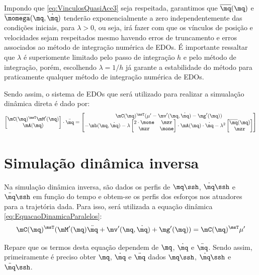 \documentclass[]{politex}
\begin{document}
Impondo que \eqref{eq:VinculosQuasiAce3} seja respeitada, garantimos que $\overline{\mq}(\mq)$ e $\overline{\momega}(\mq, \dot{\mq})$ tenderão exponencialmente a zero independentemente das condições iniciais, para $\lambda > 0$, ou seja, irá fazer com que os vínculos de posição e velocidades sejam respeitados mesmo havendo erros de truncamento e erros associados ao método de integração numérica de EDOs. É importante ressaltar que $\lambda$ é superiomente limitado pelo passo de integração $h$ e pelo método de integração, porém, escolhendo $\lambda = 1/h$ já garante a estabilidade do método para praticamente qualquer método de integração numérica de EDOs.

Sendo assim, o sistema de EDOs que será utilizado para realizar a simualação dinâmica direta é dado por:
\begin{equation}
\begin{bmatrix}
\mC(\mq)^\msT \mM'(\mq) \\
\mA(\mq)
\end{bmatrix}
\cdot
\ddot{\mq}
=
\begin{bmatrix}
\mC(\mq)^\msT (\mu' - \mv'(\mq,\dot{\mq}) - \mg'(\mq) ) \\
-\mb(\mq,\dot{\mq}) -
\lambda
\begin{bmatrix}
2 \cdot \mone & \mzr \\
\mzr & \mone
\end{bmatrix}
\cdot
\mA(\mq) \cdot \dot{\mq} -
\lambda^2
\begin{bmatrix}
\overline{\mq}(\mq) \\
\mzr
\end{bmatrix} 
\end{bmatrix}
\end{equation}

\section{Simulação dinâmica inversa} \label{S05-03-05}

Na simulação dinâmica inversa, são dados os perfis de $\mq\ssh$, $\dot{\mq}\ssh$ e $\ddot{\mq}\ssh$ em função do tempo e obtem-se os perfis dos esforços nos atuadores para a trajetória dada. Para isso, será utilizada a equação dinâmica \eqref{eq:EquacaoDinamicaParalelos}:
$$ \mC(\mq)^\msT (   \mM'(\mq)\ddot{\mq} + \mv'(\mq,\dot{\mq}) + \mg'(\mq) ) = \mC(\mq)^\msT \mu' $$

Repare que os termos desta equação dependem de $\mq$, $\dot{\mq}$ e $\ddot{\mq}$. Sendo assim, primeiramente é preciso obter $\mq$, $\dot{\mq}$ e $\ddot{\mq}$ dados $\mq\ssh$, $\dot{\mq}\ssh$ e $\ddot{\mq}\ssh$.
\end{document}
